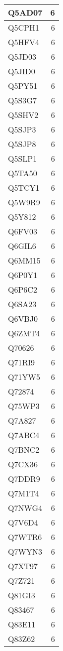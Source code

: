 \documentclass[
]{book}
\theoremstyle{definition}
\theoremstyle{definition}
\theoremstyle{definition}
\theoremstyle{definition}
\theoremstyle{remark}
\begin{document}
\begin{table}
\begin{tabular}{l|r}
\hline
Q5AD07 & 6\\
\hline
Q5CPH1 & 6\\
\hline
Q5HFV4 & 6\\
\hline
Q5JD03 & 6\\
\hline
Q5JID0 & 6\\
\hline
Q5PY51 & 6\\
\hline
Q5S3G7 & 6\\
\hline
Q5SHV2 & 6\\
\hline
Q5SJP3 & 6\\
\hline
Q5SJP8 & 6\\
\hline
Q5SLP1 & 6\\
\hline
Q5TA50 & 6\\
\hline
Q5TCY1 & 6\\
\hline
Q5W9R9 & 6\\
\hline
Q5Y812 & 6\\
\hline
Q6FV03 & 6\\
\hline
Q6GIL6 & 6\\
\hline
Q6MM15 & 6\\
\hline
Q6P0Y1 & 6\\
\hline
Q6P6C2 & 6\\
\hline
Q6SA23 & 6\\
\hline
Q6VBJ0 & 6\\
\hline
Q6ZMT4 & 6\\
\hline
Q70626 & 6\\
\hline
Q71RI9 & 6\\
\hline
Q71YW5 & 6\\
\hline
Q72874 & 6\\
\hline
Q75WP3 & 6\\
\hline
Q7A827 & 6\\
\hline
Q7ABC4 & 6\\
\hline
Q7BNC2 & 6\\
\hline
Q7CX36 & 6\\
\hline
Q7DDR9 & 6\\
\hline
Q7M1T4 & 6\\
\hline
Q7NWG4 & 6\\
\hline
Q7V6D4 & 6\\
\hline
Q7WTR6 & 6\\
\hline
Q7WYN3 & 6\\
\hline
Q7XT97 & 6\\
\hline
Q7Z721 & 6\\
\hline
Q81GI3 & 6\\
\hline
Q83467 & 6\\
\hline
Q83E11 & 6\\
\hline
Q83Z62 & 6\\

\end{tabular}
\end{table}
\end{document}
